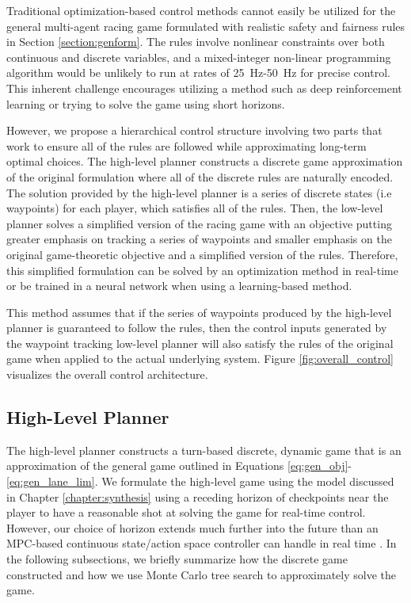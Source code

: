 Traditional optimization-based control methods cannot easily be utilized for the general multi-agent racing game formulated with realistic safety and fairness rules in Section \ref{section:genform}. The rules involve nonlinear constraints over both continuous and discrete variables, and a mixed-integer non-linear programming algorithm would be unlikely to run at rates of \SI{25}{\hertz}-\SI{50}{\hertz} for precise control. This inherent challenge encourages utilizing a method such as deep reinforcement learning or trying to solve the game using short horizons. 

However, we propose a hierarchical control structure involving two parts that work to ensure all of the rules are followed while approximating long-term optimal choices. The high-level planner constructs a discrete game approximation of the original formulation where all of the discrete rules are naturally encoded. The solution provided by the high-level planner is a series of discrete states (i.e waypoints) for each player, which satisfies all of the rules. Then, the low-level planner solves a simplified version of the racing game with an objective putting greater emphasis on tracking a series of waypoints and smaller emphasis on the original game-theoretic objective and a simplified version of the rules. Therefore, this simplified formulation can be solved by an optimization method in real-time or be trained in a neural network when using a learning-based method. 

This method assumes that if the series of waypoints produced by the high-level planner is guaranteed to follow the rules, then the control inputs generated by the waypoint tracking low-level planner will also satisfy the rules of the original game when applied to the actual underlying system. Figure \ref{fig:overall_control} visualizes the overall control architecture. 

\subsection{High-Level Planner}
The high-level planner constructs a turn-based discrete, dynamic game that is an approximation of the general game outlined in Equations \eqref{eq:gen_obj}-\eqref{eq:gen_lane_lim}. We formulate the high-level game using the model discussed in Chapter \ref{chapter:synthesis} using a receding horizon of checkpoints near the player to have a reasonable shot at solving the game for real-time control. However, our choice of horizon extends much further into the future than an MPC-based continuous state/action space controller can handle in real time \cite{Wang2019}. In the following subsections, we briefly summarize how the discrete game constructed and how we use Monte Carlo tree search to approximately solve the game.

